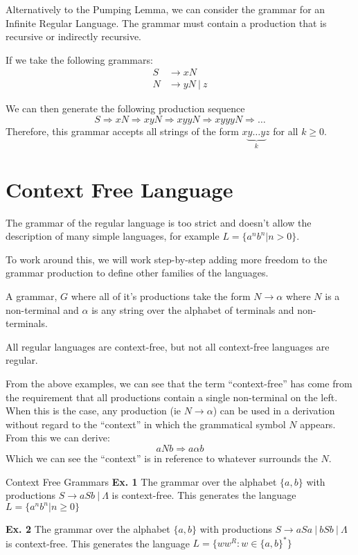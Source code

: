 Alternatively to the Pumping Lemma, we can consider the grammar for an Infinite Regular Language. The grammar must contain a production that is recursive or indirectly recursive. 

If we take the following grammars:
\begin{align*}
S & \rightarrow xN\\
N & \rightarrow yN\ |\ z
\end{align*}

We can then generate the following production sequence
\[S \Rightarrow xN \Rightarrow xyN \Rightarrow xyyN \Rightarrow xyyyN \Rightarrow \ldots\]
Therefore, this grammar accepts all strings of the form $x \underbrace{y\ldots y}_k z$ for all $k \geq 0$. 

\section{Context Free Language}
The grammar of the regular language is too strict and doesn't allow the description of many simple languages, for example $L = \{a^nb^n | n > 0\}$.

To work around this, we will work step-by-step adding more freedom to the grammar production to define other families of the languages.

\begin{define}
    \item[Context Free Grammar] A grammar, $G$ where all of it's productions take the form $N \rightarrow \alpha$ where $N$ is a non-terminal and $\alpha$ is any string over the alphabet of terminals and non-terminals. 
\end{define}
All regular languages are context-free, but not all context-free languages are regular.

From the above examples, we can see that the term ``context-free'' has come from the requirement that all productions contain a single non-terminal on the left. When this is the case, any production (ie $N \rightarrow \alpha$) can be used in a derivation without regard to the ``context'' in which the grammatical symbol $N$ appears. From this we can derive:
\[aNb \Rightarrow a\alpha b\]
Which we can see the ``context'' is in reference to whatever surrounds the $N$.

\begin{example}{Context Free Grammars}
\textbf{Ex. 1} The grammar over the alphabet $\{a,b\}$ with productions $S \rightarrow aSb\ |\ \Lambda$ is context-free. This generates the language $L=\{a^nb^n | n \geq 0\}$

\textbf{Ex. 2} The grammar over the alphabet $\{a,b\}$ with productions $S \rightarrow aSa\ |\ bSb\ |\ \Lambda$ is context-free. This generates the language $L = \{ww^R : w \in \{a,b\}^*\}$
\end{example}

